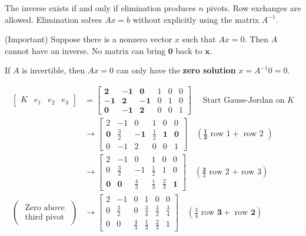 \begin{remark}
    The inverse exists if and only if elimination produces $n$ pivots. Row exchanges are allowed. Elimination solves $Ax = b$ without explicitly using the matrix $A^{-1}$.
\end{remark}

\begin{remark}
    (Important) Suppose there is a nonzero vector $ x $ such that $ A x=0 . $ Then $ A $ cannot have an inverse. No matrix can bring $ \mathbf{0} $ back to $ \boldsymbol{x} $.

If $ A $ is invertible, then $ A x=0 $ can only have the \textbf{zero solution} $ x=A^{-1} 0=0 $.
\end{remark}


\begin{example}
    \begin{equation} \begin{aligned}\left[\begin{array}{llll}K & e_{1} & e_{2} & e_{3}\end{array}\right] & =\left[\begin{array}{rrrrrr}\mathbf{2} & -\mathbf{1} & \mathbf{0} & 1 & 0 & 0 \\ -\mathbf{1} & \mathbf{2} & -\mathbf{1} & 0 & 1 & 0 \\ \mathbf{0} & -\mathbf{1} & \mathbf{2} & 0 & 0 & 1\end{array}\right] \quad \text { Start Gauss-Jordan on } K                                                  \\ & \rightarrow\left[\begin{array}{rrrrrr}2 & -1 & 0 & 1 & 0 & 0 \\ \mathbf{0} & \frac{3}{2} & -\mathbf{1} & \frac{1}{2} & \mathbf{1} & \mathbf{0} \\ 0 & -1 & 2 & 0 & 0 & 1\end{array}\right] \quad\left(\frac{\mathbf{1}}{\mathbf{2}} \text { row } 1+\text { row 2 }\right) \\ & \rightarrow\left[\begin{array}{rrrrrr}2 & -1 & 0 & 1 & 0 & 0 \\ 0 & \frac{3}{2} & -1 & \frac{1}{2} & 1 & 0 \\ \mathbf{0} & \mathbf{0} & \frac{4}{3} & \frac{1}{3} & \frac{2}{3} & \mathbf{1}\end{array}\right] \quad \left(\frac{\mathbf{2}}{3} \text { row 2 + row 3}\right)\\
               \left(\begin{array}{c}\text { Zero above } \\ \text { third pivot }\end{array}\right) & \rightarrow\left[\begin{array}{rrrrrr}2 & -1 & 0 & 1 & 0 & 0 \\ 0 & \frac{3}{2} & 0 & \frac{3}{4} & \frac{3}{2} & \frac{3}{4} \\ 0 & 0 & \frac{4}{3} & \frac{1}{3} & \frac{2}{3} & 1\end{array}\right] \quad\left(\frac{3}{4} \text{ row } \mathbf{3}+ \text{ row } \mathbf{2}\right) \\

\end{aligned}
\end{equation}
\end{example}
